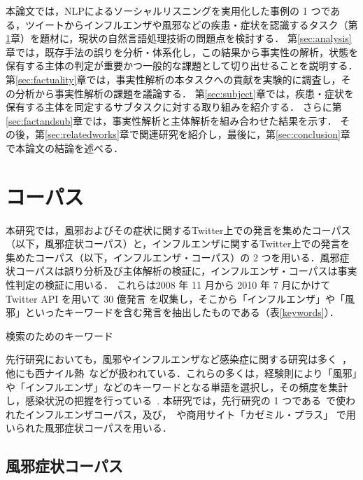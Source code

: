 \documentclass[japanese]{jnlp_1.4}
\begin{document}
本論文では，NLPによるソーシャルリスニングを実用化した事例の 1 つである，ツイートからインフルエンザや風邪などの疾患・症状を認識するタスク（第\ref{sec:used-corpus}章）を題材に，現状の自然言語処理技術の問題点を検討する．
第\ref{sec:analysis}章では，既存手法の誤りを分析・体系化し，この結果から事実性の解析，状態を保有する主体の判定が重要かつ一般的な課題として切り出せることを説明する．
第\ref{sec:factuality}章では，事実性解析の本タスクへの貢献を実験的に調査し，その分析から事実性解析の課題を議論する．
第\ref{sec:subject}章では，疾患・症状を保有する主体を同定するサブタスクに対する取り組みを紹介する．
さらに第\ref{sec:factandsub}章では，事実性解析と主体解析を組み合わせた結果を示す．
その後，第\ref{sec:relatedworks}章で関連研究を紹介し，最後に，第\ref{sec:conclusion}章で本論文の結論を述べる．



\section{コーパス}
\label{sec:used-corpus}

本研究では，風邪およびその症状に関するTwitter上での発言を集めたコーパス（以下，風邪症状コーパス）と，インフルエンザに関するTwitter上での発言を集めたコーパス（以下，インフルエンザ・コーパス）の 2 つを用いる．風邪症状コーパスは誤り分析及び主体解析の検証に，インフルエンザ・コーパスは事実性判定の検証に用いる．
これらは2008 年 11 月から 2010 年 7 月にかけて Twitter API を用いて 30 億発言 を収集し，そこから「インフルエンザ」や「風邪」といったキーワードを含む発言を抽出したものである（表\ref{keywords}）．

\begin{table}[b]
\caption{検索のためのキーワード}
\label{keywords}

\end{table}

先行研究においても，風邪やインフルエンザなど感染症に関する研究は多く~\cite{lamb-paul-dredze:2013:NAACL-HLT}，他にも西ナイル熱~\cite{sugumaran2012real}などが扱われている．これらの多くは，経験則により「風邪」や「インフルエンザ」などのキーワードとなる単語を選択し，その頻度を集計し，感染状況の把握を行っている~\cite{culotta2010detecting,aramaki-maskawa-morita:2011:EMNLP}. 本研究では，先行研究の 1 つである~\cite{aramaki-maskawa-morita:2011:EMNLP}で使われたインフルエンザコーパス，及び，~\cite{荒牧2011}や商用サイト「カゼミル・プラス」 で用いられた風邪症状コーパスを用いる．


\subsection{風邪症状コーパス}
\end{document}
